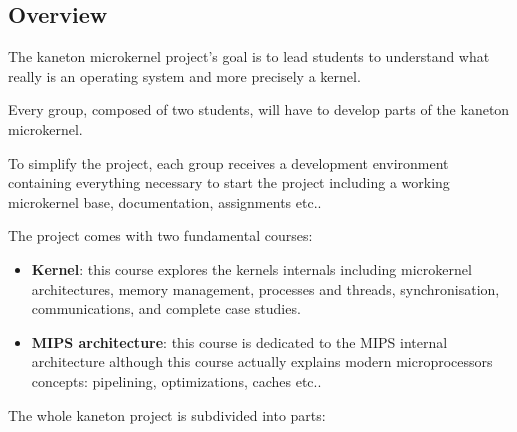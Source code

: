 \begin{multicols}{2}


%
%

\section{Overview}

The kaneton microkernel project's goal is to lead students to understand
what really is an operating system and more precisely a kernel.

Every group, composed of two students, will have to develop parts of
the kaneton microkernel.

To simplify the project, each group receives a development environment
containing everything necessary to start the project including a
working microkernel base, documentation, assignments etc..

The project comes with two fundamental courses:

\begin{itemize}
  \item
    \textbf{Kernel}: this course explores the kernels internals including
    microkernel architectures, memory management, processes and threads,
    synchronisation, communications, and complete case studies.
  \item
    \textbf{MIPS architecture}: this course is dedicated to the MIPS internal
    architecture although this course actually explains modern microprocessors
    concepts: pipelining, optimizations, caches etc..
\end{itemize}

The whole kaneton project is subdivided into parts:


\end{multicols}
